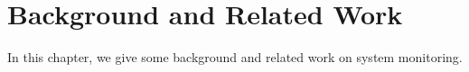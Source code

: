 \chapter{Background and Related Work}
\label{sec:bg}

In this chapter, we give some background and related work on system monitoring.
